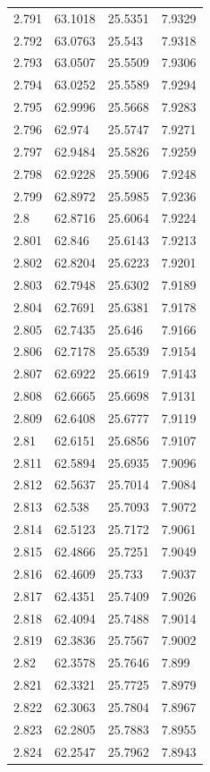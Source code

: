 \begin{tabular}{llll}
2.791 & 63.1018 & 25.5351 & 7.9329 \\
2.792 & 63.0763 & 25.543 & 7.9318 \\
2.793 & 63.0507 & 25.5509 & 7.9306 \\
2.794 & 63.0252 & 25.5589 & 7.9294 \\
2.795 & 62.9996 & 25.5668 & 7.9283 \\
2.796 & 62.974 & 25.5747 & 7.9271 \\
2.797 & 62.9484 & 25.5826 & 7.9259 \\
2.798 & 62.9228 & 25.5906 & 7.9248 \\
2.799 & 62.8972 & 25.5985 & 7.9236 \\
2.8 & 62.8716 & 25.6064 & 7.9224 \\
2.801 & 62.846 & 25.6143 & 7.9213 \\
2.802 & 62.8204 & 25.6223 & 7.9201 \\
2.803 & 62.7948 & 25.6302 & 7.9189 \\
2.804 & 62.7691 & 25.6381 & 7.9178 \\
2.805 & 62.7435 & 25.646 & 7.9166 \\
2.806 & 62.7178 & 25.6539 & 7.9154 \\
2.807 & 62.6922 & 25.6619 & 7.9143 \\
2.808 & 62.6665 & 25.6698 & 7.9131 \\
2.809 & 62.6408 & 25.6777 & 7.9119 \\
2.81 & 62.6151 & 25.6856 & 7.9107 \\
2.811 & 62.5894 & 25.6935 & 7.9096 \\
2.812 & 62.5637 & 25.7014 & 7.9084 \\
2.813 & 62.538 & 25.7093 & 7.9072 \\
2.814 & 62.5123 & 25.7172 & 7.9061 \\
2.815 & 62.4866 & 25.7251 & 7.9049 \\
2.816 & 62.4609 & 25.733 & 7.9037 \\
2.817 & 62.4351 & 25.7409 & 7.9026 \\
2.818 & 62.4094 & 25.7488 & 7.9014 \\
2.819 & 62.3836 & 25.7567 & 7.9002 \\
2.82 & 62.3578 & 25.7646 & 7.899 \\
2.821 & 62.3321 & 25.7725 & 7.8979 \\
2.822 & 62.3063 & 25.7804 & 7.8967 \\
2.823 & 62.2805 & 25.7883 & 7.8955 \\
2.824 & 62.2547 & 25.7962 & 7.8943 \\

\end{tabular}
